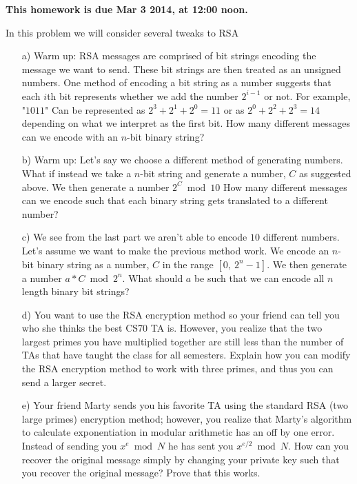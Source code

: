 \documentclass[]{article}
\begin{document}
\maketitle
{}
\vspace{0.5em}
{\Large{\textbf{This homework is due Mar 3 2014, at 12:00 noon.}}}

\begin{qunlist}
  
In this problem we will consider several tweaks to RSA
\begin{itemize}
\qpart
\item [a)] Warm up: RSA messages are comprised of bit strings encoding the message we want to send. These bit strings are then treated as an unsigned numbers. One method of encoding a bit string as a number suggests that each $i$th bit represents whether we add the number $2^{i-1}$ or not. For example, "$1011$" Can be represented as $2^3 + 2^1 + 2^0 = 11$ or as $2^0 + 2^2 + 2^3 = 14$ depending on what we interpret as the first bit. How many different messages can we encode with an $n$-bit binary string?
\qpart
\item [b)] Warm up: Let's say we choose a different method of generating numbers. What if instead we take a $n$-bit string and generate a number, $C$ as suggested above. We then generate a number $2^C \bmod 10$ How many different messages can we encode such that each binary string gets translated to a different number?
\qpart
\item [c)] We see from the last part we aren't able to encode $10$ different numbers. Let's assume we want to make the previous method work. We encode an $n$-bit binary string as a number, $C$ in the range $[0, \ 2^n -1]$. We then generate a number $a*C \bmod{2^n}$. What should $a$ be such that we can encode all $n$ length binary bit strings?
\qpart
\item [d)] You want to use the RSA encryption method so your friend can tell you who she thinks the best CS70 TA is. However, you realize that the two largest primes you have multiplied together are still less than the number of TAs that have taught the class for all semesters. Explain how you can modify the RSA encryption method to work with three primes, and thus you can send a larger secret.
\item [e)] Your friend Marty sends you his favorite TA using the standard RSA (two large primes) encryption method; however, you realize that Marty's algorithm to calculate exponentiation in modular arithmetic has an off by one error. Instead of sending you $x^e \bmod{N}$ he has sent you $x^{e/2} \bmod{N}$. How can you recover the original message simply by changing your private key such that you recover the original message? Prove that this works.


\end{itemize}
\end{qunlist}
\end{document}
